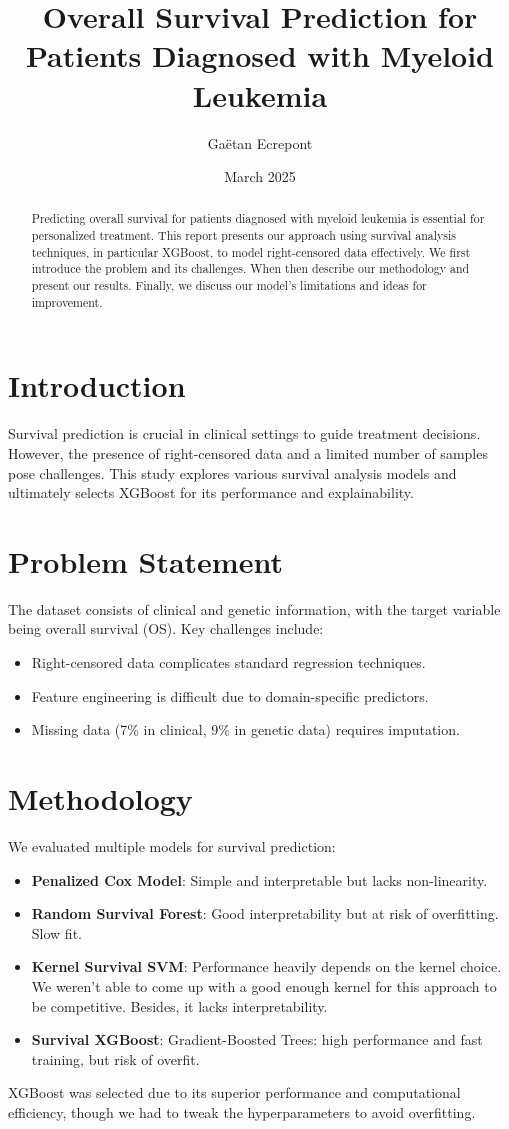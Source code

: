 \documentclass{article}
\title{Overall Survival Prediction for Patients Diagnosed with Myeloid Leukemia}
\author{Gaëtan Ecrepont}
\date{March 2025}
\begin{document}
\maketitle

\begin{abstract}
Predicting overall survival for patients diagnosed with myeloid leukemia is essential for personalized treatment. This report presents our approach using survival analysis techniques, in particular XGBoost, to model right-censored data effectively. We first introduce the problem and its challenges. When then describe our methodology and present our results. Finally, we discuss our model's limitations and ideas for improvement.
\end{abstract}

\section{Introduction}
Survival prediction is crucial in clinical settings to guide treatment decisions. However, the presence of right-censored data and a limited number of samples pose challenges. This study explores various survival analysis models and ultimately selects XGBoost for its performance and explainability.

\section{Problem Statement}
The dataset consists of clinical and genetic information, with the target variable being overall survival (OS). Key challenges include:
\begin{itemize}
    \item Right-censored data complicates standard regression techniques.
    \item Feature engineering is difficult due to domain-specific predictors.
    \item Missing data (7\% in clinical, 9\% in genetic data) requires imputation.
\end{itemize}

\section{Methodology}
We evaluated multiple models for survival prediction:
\begin{itemize}
    \item \textbf{Penalized Cox Model}: Simple and interpretable but lacks non-linearity.
    \item \textbf{Random Survival Forest}: Good interpretability but at risk of overfitting. Slow fit.
    \item \textbf{Kernel Survival SVM}: Performance heavily depends on the kernel choice. We weren't able to come up with a good enough kernel for this approach to be competitive. Besides, it lacks interpretability.
    \item \textbf{Survival XGBoost}: Gradient-Boosted Trees: high performance and fast training, but risk of overfit.
\end{itemize}
XGBoost was selected due to its superior performance and computational efficiency, though we had to tweak the hyperparameters to avoid overfitting.
\end{document}
